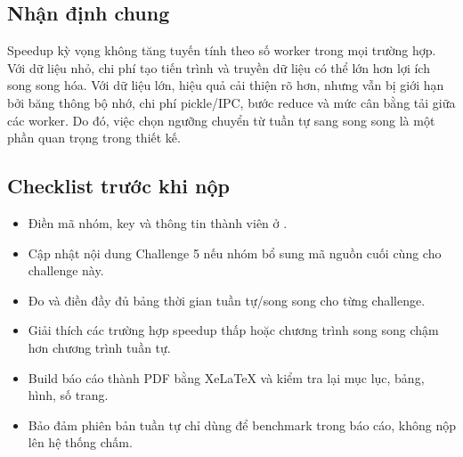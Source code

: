 \subsection{Nhận định chung}
Speedup kỳ vọng không tăng tuyến tính theo số worker trong mọi trường hợp. Với dữ liệu nhỏ, chi phí tạo tiến trình và truyền dữ liệu có thể lớn hơn lợi ích song song hóa. Với dữ liệu lớn, hiệu quả cải thiện rõ hơn, nhưng vẫn bị giới hạn bởi băng thông bộ nhớ, chi phí pickle/IPC, bước reduce và mức cân bằng tải giữa các worker. Do đó, việc chọn ngưỡng chuyển từ tuần tự sang song song là một phần quan trọng trong thiết kế.

\subsection{Checklist trước khi nộp}
\begin{itemize}
  \item Điền mã nhóm, key và thông tin thành viên ở .
  \item Cập nhật nội dung Challenge 5 nếu nhóm bổ sung mã nguồn cuối cùng cho challenge này.
  \item Đo và điền đầy đủ bảng thời gian tuần tự/song song cho từng challenge.
  \item Giải thích các trường hợp speedup thấp hoặc chương trình song song chậm hơn chương trình tuần tự.
  \item Build báo cáo thành PDF bằng XeLaTeX và kiểm tra lại mục lục, bảng, hình, số trang.
  \item Bảo đảm phiên bản tuần tự chỉ dùng để benchmark trong báo cáo, không nộp lên hệ thống chấm.
\end{itemize}
